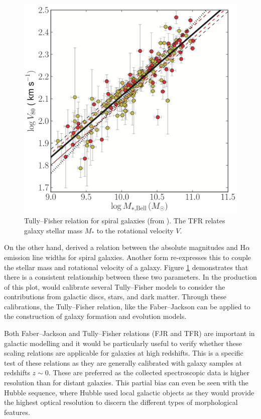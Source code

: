 \documentclass[12pt, twocolumn]{revtex4-1}    %
\begin{document}
\begin{figure}
\includegraphics[width=\linewidth]{introduction/reyes_2011}
\caption{Tully--Fisher relation for spiral galaxies (from \citealt{2012ApJS..203...17R}). The TFR relates galaxy stellar mass $M_*$ to the rotational velocity $V$.}
\label{fig:tully_fisher}
\end{figure}

On the other hand, \cite{1977A&A....54..661T} derived a relation between the absolute magnitudes and H$\alpha$ emission line widths for spiral galaxies. Another form re-expresses this to couple the stellar mass and rotational velocity of a galaxy. Figure \ref{fig:tully_fisher} demonstrates that there is a consistent relationship between these two parameters. In the production of this plot, \cite{2011MNRAS.417.2347R} would calibrate several Tully--Fisher models to consider the contributions from galactic discs, stars, and dark matter. Through these calibrations, the Tully--Fisher relation, like the Faber--Jackson can be applied to the construction of galaxy formation and evolution models.

Both Faber--Jackson and Tully--Fisher relations (FJR and TFR) are important in galactic modelling and it would be particularly useful to verify whether these scaling relations are applicable for galaxies at high redshifts. This is a specific test of these relations as they are generally calibrated with galaxy samples at redshifts $z\sim0$. These are preferred as the collected spectroscopic data is higher resolution than for distant galaxies. This partial bias can even be seen with the Hubble sequence, where Hubble used local galactic objects as they would provide the highest optical resolution to discern the different types of morphological features.
\end{document}
